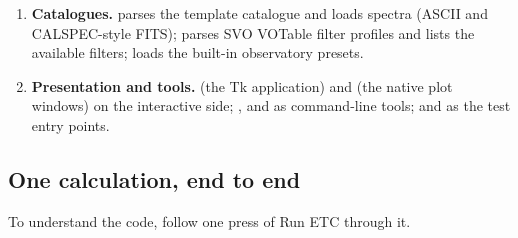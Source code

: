 \begin{enumerate}
  return plain results: a dict for photometry, a 
  with metadata in  for spectroscopy. This context is the
  API contract of the whole program: anything that can build those four
  objects can run the ETC.  inverts the S/N equation in
  closed form and plans frame stacks.
\item \textbf{Catalogues.}  parses the template
  catalogue and loads spectra (ASCII and CALSPEC-style FITS);
   parses SVO VOTable filter profiles and lists
  the available filters;  loads the built-in
  observatory presets.
\item \textbf{Presentation and tools.}  (the Tk
  application) and  (the native plot windows)
  on the interactive side; ,
   and  as
  command-line tools;  and
   as the test entry points.
\end{enumerate}

\subsection{One calculation, end to end}

To understand the code, follow one press of \textsf{Run ETC} through it.

